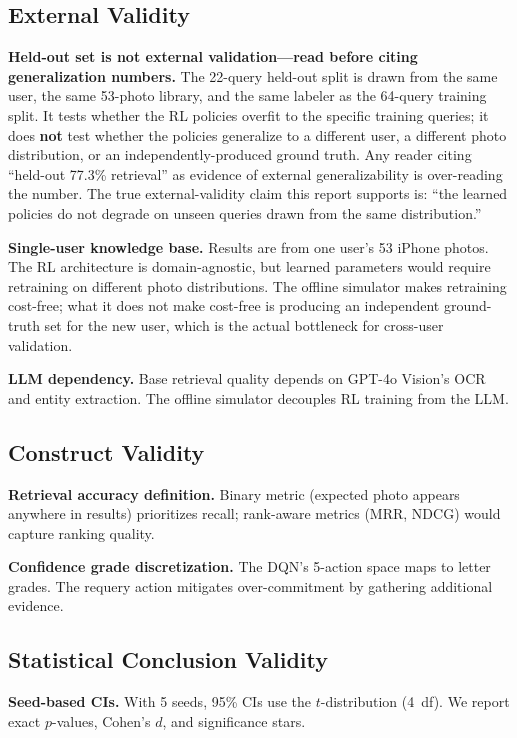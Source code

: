 \documentclass[11pt,letterpaper]{article}
\begin{document}
\subsection{External Validity}

\textbf{Held-out set is not external validation---read before citing generalization numbers.} The 22-query held-out split is drawn from the same user, the same 53-photo library, and the same labeler as the 64-query training split. It tests whether the RL policies overfit to the specific training queries; it does \textbf{not} test whether the policies generalize to a different user, a different photo distribution, or an independently-produced ground truth. Any reader citing ``held-out 77.3\% retrieval'' as evidence of external generalizability is over-reading the number. The true external-validity claim this report supports is: ``the learned policies do not degrade on unseen queries drawn from the same distribution.''

\textbf{Single-user knowledge base.} Results are from one user's 53 iPhone photos. The RL architecture is domain-agnostic, but learned parameters would require retraining on different photo distributions. The offline simulator makes retraining cost-free; what it does not make cost-free is producing an independent ground-truth set for the new user, which is the actual bottleneck for cross-user validation.

\textbf{LLM dependency.} Base retrieval quality depends on GPT-4o Vision's OCR and entity extraction. The offline simulator decouples RL training from the LLM.

\subsection{Construct Validity}

\textbf{Retrieval accuracy definition.} Binary metric (expected photo appears anywhere in results) prioritizes recall; rank-aware metrics (MRR, NDCG) would capture ranking quality.

\textbf{Confidence grade discretization.} The DQN's 5-action space maps to letter grades. The requery action mitigates over-commitment by gathering additional evidence.

\subsection{Statistical Conclusion Validity}

\textbf{Seed-based CIs.} With 5 seeds, 95\% CIs use the $t$-distribution (4~df). We report exact $p$-values, Cohen's $d$, and significance stars.
\end{document}
